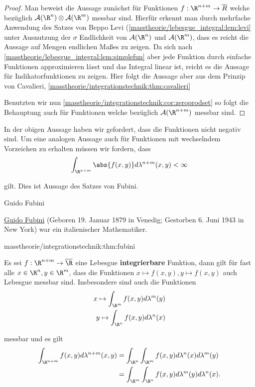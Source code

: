 \documentclass[letterpaper,10pt,german]{jupyterBook}
\begin{document}
\begin{proof}
 Man beweist die Aussage zunächst für Funktionen \(f:\R^{n+m}\to\overline{R}\) welche bezüglich \(\mathcal{A}(\R^n)\otimes\mathcal{A}(\R^m)\) messbar sind. Hierfür erkennt man durch mehrfache Anwendung des Satzes von Beppo Levi (\cref{masstheorie/lebesgue_integral:lem:levi}  unter Ausnutzung der \(\sigma\) Endlichkeit von \(\mathcal{A}(\R^n)\) und \(\mathcal{A}(\R^m)\), dass es reicht die Aussage auf Mengen endlichen Maßes zu zeigen. Da sich nach \cref{masstheorie/lebesgue_integral:lem:simplefun} aber jede Funktion durch einfache Funktionen approximieren lässt und das Integral linear ist, reicht es die Aussage für Indikatorfunktionen zu zeigen. Hier folgt die Aussage aber aus dem Prinzip von Cavalieri, \cref{masstheorie/integrationstechnik:thm:cavalieri} 

\par
Benutzten wir nun \cref{masstheorie/integrationstechnik:cor:zeroprodset} so folgt die Behauptung auch für Funktionen welche bezüglich \(\mathcal{A}(\R^{n+m})\) messbar sind.
\end{proof}

\par
In der obigen Aussage haben wir gefordert, dass die Funktionen nicht negativ sind. Um eine analogen Aussage auch für Funktionen mit wechselndem Vorzeichen zu erhalten müssen wir fordern, dass
\begin{align*}
\int_{\R^{n+m}} \abs{f(x,y)} d\lambda^{n+m}(x,y) <\infty
\end{align*}
\par
gilt. Dies ist Aussage des Satzes von Fubini.

\begin{emphBox}{Guido Fubini}{}

\par
\href{https://de.wikipedia.org/wiki/Guido\_Fubini}{Guido Fubini} (Geboren 19. Januar 1879 in Venedig; Gestorben 6. Juni 1943 in New York) war ein italienischer Mathematiker.
\end{emphBox}
\begin{theorem}{}{masstheorie/integrationstechnik:thm:fubini}



\par
Es sei \(f:\R^{n+m}\to \overline{\R}\) eine Lebesgue \textbf{integrierbare} Funktion, dann gilt für fast alle \(x\in\R^n,y\in\R^m\), dass die Funktionen \(x\mapsto f(x,y), y\mapsto f(x,y)\) auch Lebesgue messbar sind. Insbesondere sind auch die Funktionen
\begin{align*}
x \mapsto \int_{\R^m} f(x,y) d\lambda^m(y)\\
y \mapsto \int_{\R^n} f(x,y) d\lambda^n(x)
\end{align*}
\par
messbar und es gilt
\begin{align*}
\int_{\R^{n+m}} f(x,y) d\lambda^{n+m}(x,y) &= \int_{\R^n}\int_{\R^m} f(x,y) d\lambda^{n}(x)d\lambda^m(y)\\
&=
\int_{\R^m}\int_{\R^n} f(x,y) d\lambda^{m}(y)d\lambda^n(x).
\end{align*}\end{theorem}
\end{document}
